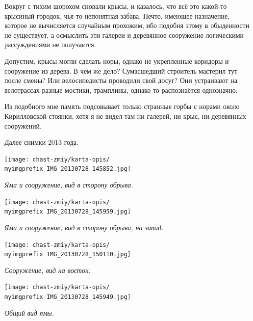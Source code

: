 Вокруг с тихим шорохом сновали крысы, и казалось, что всё это какой-то крысиный городок, чья-то непонятная забава. Нечто, имеющее назначение, которое не вычисляется случайным прохожим, ибо подобия этому в обыденности не существует, а осмыслить эти галереи и деревянное сооружение логическими рассуждениями не получается. 

Допустим, крысы могли сделать норы, однако не укрепленные коридоры и сооружение из дерева. В чем же дело? Сумасшедший строитель мастерил тут после смены? Или велосипедисты проводили свой досуг? Они устраивают на велотрассах разные мостики, трамплины, однако то распознаётся однозначно.

Из подобного мне память подсовывает только странные горбы с норами около Кирилловской стоянки, хотя я не видел там ни галерей, ни крыс, ни деревянных сооружений.

Далее снимки 2013 года. 

\begin{center}
\texttt{[image: chast-zmiy/karta-opis/\\myimgprefix IMG\_20130728\_145852.jpg]}

\textit{Яма и сооружение, вид в сторону обрыва.}
\end{center}


\newpage
\vspace*{\fill}
\begin{center}
\texttt{[image: chast-zmiy/karta-opis/\\myimgprefix IMG\_20130728\_145959.jpg]}

\textit{Яма и сооружение, вид в сторону обрыва, на запад.}
\end{center}
\vspace*{\fill}


\newpage

\vspace*{\fill}
\begin{center}
\texttt{[image: chast-zmiy/karta-opis/\\myimgprefix IMG\_20130728\_150110.jpg]}

\textit{Сооружение, вид на восток.}
\end{center}
\vspace*{\fill}

\newpage

\begin{center}
\texttt{[image: chast-zmiy/karta-opis/\\myimgprefix IMG\_20130728\_145949.jpg]}

\textit{Общий вид ямы.}
\end{center}

